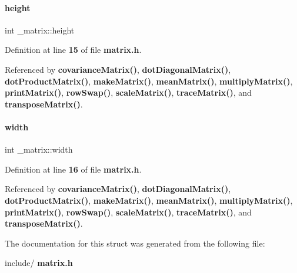 \mbox{\label{struct__matrix_a8d3b2dbcf98704f11073d646273eb3b0}} 
\paragraph{height}
{\footnotesize\ttfamily int \+\_\+matrix\+::height}



Definition at line \textbf{ 15} of file \textbf{ matrix.\+h}.



Referenced by \textbf{ covariance\+Matrix()}, \textbf{ dot\+Diagonal\+Matrix()}, \textbf{ dot\+Product\+Matrix()}, \textbf{ make\+Matrix()}, \textbf{ mean\+Matrix()}, \textbf{ multiply\+Matrix()}, \textbf{ print\+Matrix()}, \textbf{ row\+Swap()}, \textbf{ scale\+Matrix()}, \textbf{ trace\+Matrix()}, and \textbf{ transpose\+Matrix()}.

\mbox{\label{struct__matrix_a30d055d00e1b4afea4568f2aa1cf5c37}} 
\paragraph{width}
{\footnotesize\ttfamily int \+\_\+matrix\+::width}



Definition at line \textbf{ 16} of file \textbf{ matrix.\+h}.



Referenced by \textbf{ covariance\+Matrix()}, \textbf{ dot\+Diagonal\+Matrix()}, \textbf{ dot\+Product\+Matrix()}, \textbf{ make\+Matrix()}, \textbf{ mean\+Matrix()}, \textbf{ multiply\+Matrix()}, \textbf{ print\+Matrix()}, \textbf{ row\+Swap()}, \textbf{ scale\+Matrix()}, \textbf{ trace\+Matrix()}, and \textbf{ transpose\+Matrix()}.



The documentation for this struct was generated from the following file\+:\begin{DoxyCompactItemize}
\item 
include/\textbf{ matrix.\+h}\end{DoxyCompactItemize}
